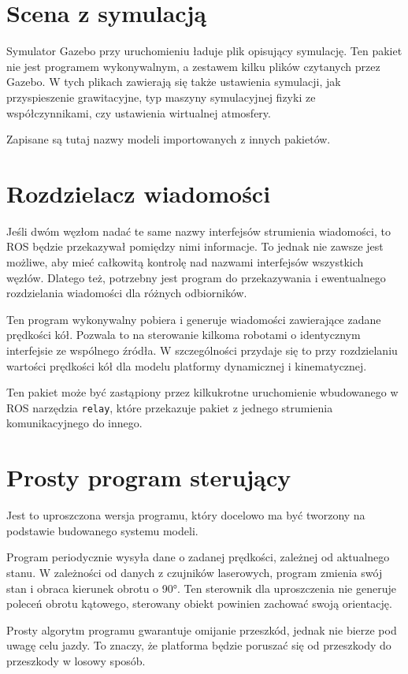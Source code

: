 \section{Scena z symulacją}
	Symulator Gazebo przy uruchomieniu ładuje plik opisujący symulację.
	Ten pakiet nie jest programem wykonywalnym, a zestawem kilku plików czytanych przez Gazebo.
	W tych plikach zawierają się także ustawienia symulacji, jak przyspieszenie grawitacyjne, typ maszyny symulacyjnej fizyki ze współczynnikami, czy ustawienia wirtualnej atmosfery.
	
	Zapisane są tutaj nazwy modeli importowanych z innych pakietów.
	
\section{Rozdzielacz wiadomości}
	Jeśli dwóm węzłom nadać te same nazwy interfejsów strumienia wiadomości, to ROS będzie przekazywał pomiędzy nimi informacje.
	To jednak nie zawsze jest możliwe, aby mieć całkowitą kontrolę nad nazwami interfejsów wszystkich węzłów.
	Dlatego też, potrzebny jest program do przekazywania i ewentualnego rozdzielania wiadomości dla różnych odbiorników.
	
	Ten program wykonywalny pobiera i generuje wiadomości zawierające zadane prędkości kół.
	Pozwala to na sterowanie kilkoma robotami o identycznym interfejsie ze wspólnego źródła.
	W szczególności przydaje się to przy rozdzielaniu wartości prędkości kół dla modelu platformy dynamicznej i kinematycznej.
	
	Ten pakiet może być zastąpiony przez kilkukrotne uruchomienie wbudowanego w ROS narzędzia \texttt{relay}, które przekazuje pakiet z jednego strumienia komunikacyjnego do innego.
	
\section{Prosty program sterujący}
	Jest to uproszczona wersja programu, który docelowo ma być tworzony na podstawie budowanego systemu modeli.
	
	Program periodycznie wysyła dane o zadanej prędkości, zależnej od aktualnego stanu.
	W zależności od danych z czujników laserowych, program zmienia swój stan i obraca kierunek obrotu o \ang{90}.
	Ten sterownik dla uproszczenia nie generuje poleceń obrotu kątowego, sterowany obiekt powinien zachować swoją orientację.
	
	Prosty algorytm programu gwarantuje omijanie przeszkód, jednak nie bierze pod uwagę celu jazdy.
	To znaczy, że platforma będzie poruszać się od przeszkody do przeszkody w losowy sposób.
	
